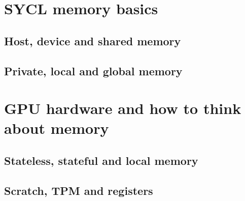 \documentclass[a4paper,12pt,oneside]{article}
\begin{document}
\section{SYCL memory basics}\label{sec:Basics}


\subsection{Host, device and shared memory}\label{subsec:HostDevice}


\subsection{Private, local and global memory}\label{subsec:PrivLocal}


\section{GPU hardware and how to think about memory}\label{sec:Basics}


\subsection{Stateless, stateful and local memory}\label{subsec:StatelessFull}


\subsection{Scratch, TPM and registers}\label{subsec:ScratchTPM}

\end{document}
